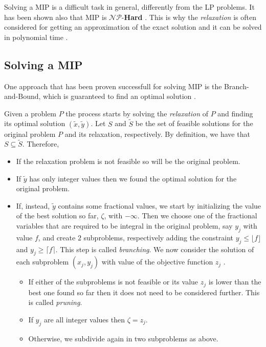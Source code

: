Solving a \acrshort{MIP} is a difficult task in general, differently from the
\acrshort{LP} problems. It has been shown also that \acrshort{MIP} is
$\mathcal{NP}$-\textbf{Hard}
\cite{Kannan1978,Liberti2019,Schrijver1998}. This is why the \emph{relaxation} is often considered
for getting an approximation of the exact solution and it can be solved in
polynomial time \cite{Conforti2016}.

\subsection{Solving a MIP}%
\label{sub:solving_a_mip}

One approach that has been proven successfull for solving \acrshort{MIP} is the
Branch-and-Bound, which is guaranteed to find an optimal solution
\cite{Conforti2016,Edgar2001}.

Given a problem $P$ the process starts by solving the \emph{relaxation} of $P$
and finding its optimal solution $(\tilde{x}, \tilde{y})$.
Let $S$ and  $\tilde{S}$ be the set of feasible solutions
for the original problem $P$ and its relaxation, respectively. By definition,
we have that $S \subseteq \tilde{S} $.
Therefore, \cite{Edgar2001}
\begin{itemize}
	\item If the relaxation problem is not feasible so will be the original
	      problem.
	\item If $\tilde{y}$ has only integer values then we found the optimal
	      solution for the original problem.
	\item If, instead, $\tilde{y}$ contains some fractional values, we start by
	      initializing the value of the best solution so far, $\zeta$, with
	      $-\infty$.  Then we choose one of the fractional variables that are
	      required to be integral in the original problem, say $y_j$ with
	      value $f$, and create $2$ subproblems, respectively adding the
	      constraint $y_{j} \leq \lfloor f \rfloor$ and $y_{j} \geq \lceil f
		      \rceil$. This step is called \emph{branching}. We now consider the
	      solution of each subproblem $(x_j, y_j)$ with value of the objective
	      function $z_{j} $ \cite{Edgar2001,Conforti2016}.

	      \begin{itemize}
		      \item If either of the subproblems is not feasible or its value
		            $z_{j} $ is lower than the best one found so far then it does
		            not need to be considered further. This is called \emph{pruning}.
		      \item If $y_{j} $ are all integer values then $\zeta =
			            z_{j} $.
		      \item Otherwise, we subdivide again in two subproblems as
		            above.
	      \end{itemize}
\end{itemize}


